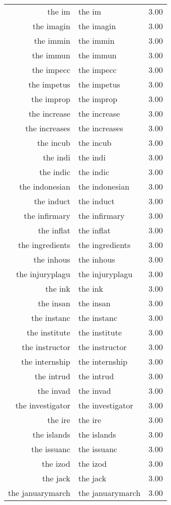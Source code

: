 \begin{table}[ht]
\begin{tabular}{rlr}
  the im & the im & 3.00 \\ 
  the imagin & the imagin & 3.00 \\ 
  the immin & the immin & 3.00 \\ 
  the immun & the immun & 3.00 \\ 
  the impecc & the impecc & 3.00 \\ 
  the impetus & the impetus & 3.00 \\ 
  the improp & the improp & 3.00 \\ 
  the increase & the increase & 3.00 \\ 
  the increases & the increases & 3.00 \\ 
  the incub & the incub & 3.00 \\ 
  the indi & the indi & 3.00 \\ 
  the indic & the indic & 3.00 \\ 
  the indonesian & the indonesian & 3.00 \\ 
  the induct & the induct & 3.00 \\ 
  the infirmary & the infirmary & 3.00 \\ 
  the inflat & the inflat & 3.00 \\ 
  the ingredients & the ingredients & 3.00 \\ 
  the inhous & the inhous & 3.00 \\ 
  the injuryplagu & the injuryplagu & 3.00 \\ 
  the ink & the ink & 3.00 \\ 
  the insan & the insan & 3.00 \\ 
  the instanc & the instanc & 3.00 \\ 
  the institute & the institute & 3.00 \\ 
  the instructor & the instructor & 3.00 \\ 
  the internship & the internship & 3.00 \\ 
  the intrud & the intrud & 3.00 \\ 
  the invad & the invad & 3.00 \\ 
  the investigator & the investigator & 3.00 \\ 
  the ire & the ire & 3.00 \\ 
  the islands & the islands & 3.00 \\ 
  the issuanc & the issuanc & 3.00 \\ 
  the izod & the izod & 3.00 \\ 
  the jack & the jack & 3.00 \\ 
  the januarymarch & the januarymarch & 3.00 \\ 

\end{tabular}
\end{table}
